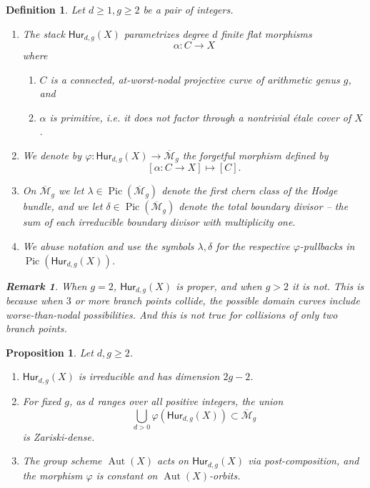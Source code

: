 \documentclass[reqno, 11pt]{amsart}
\newtheorem{proposition}[theorem]{Proposition}
\newtheorem{definition}[theorem]{Definition}
\newtheorem{remark}[theorem]{Remark}
\DeclareMathOperator{\Pic}{Pic}
\DeclareMathOperator{\Aut}{Aut}
\newcommand{\HdgX}{\mathsf{Hur}_{d,g}(X)}
\newcommand{\Mgbar}{\overline{\mathcal{M}}_{g}}
\begin{document}
\begin{definition}
    \label{definition:nodalcovers} Let $d \geq 1, g \geq 2$ be a pair of integers.  
    \begin{enumerate}       
        \item The stack $\HdgX$  parametrizes degree $d$ finite flat morphisms \[\alpha: C \to X\] where 
        \begin{enumerate}
        \item $C$ is a connected, at-worst-nodal projective curve of arithmetic genus $g$, and
        \item $\alpha$ is {\sl primitive}, i.e. it does not factor through a nontrivial \'etale cover of $X$.
        \end{enumerate}
        \item We denote by $\varphi: \HdgX \to \Mgbar$ the forgetful morphism defined by \[[\alpha: C \to X]  \mapsto [C].\]
        \item On $\Mgbar$ we let $\lambda \in \Pic (\Mgbar)$ denote the first chern class of the Hodge bundle, and we let $\delta \in \Pic (\Mgbar)$ denote the total boundary divisor -- the sum of each irreducible boundary divisor with multiplicity one.  
        \item We abuse notation and use the symbols $\lambda, \delta$ for the respective $\varphi$-pullbacks in $\Pic (\HdgX)$.
    \end{enumerate}
     
\begin{remark}
    When $g =2$, $\HdgX$ is proper, and when $g > 2$ it is not.  This is  because when $3$ or more branch points collide, the possible domain curves include worse-than-nodal possibilities.  And this is not true for collisions of only two branch points.
\end{remark}
    
\end{definition}

\begin{proposition}
    \label{lemma:basics} 
    Let $d,g \geq 2$.
    \begin{enumerate}
        \item $\HdgX$ is irreducible and has dimension $2g-2$.
        \item For fixed $g$, as $d$ ranges over all positive integers, the union \[\bigcup_{d > 0} \varphi(\HdgX) \subset \Mgbar\] is Zariski-dense.
        \item The group scheme $\Aut(X)$ acts on $\HdgX$ via post-composition, and the morphism $\varphi$ is constant on $\Aut(X)$-orbits.
    \end{enumerate}
\end{proposition}
\end{document}
